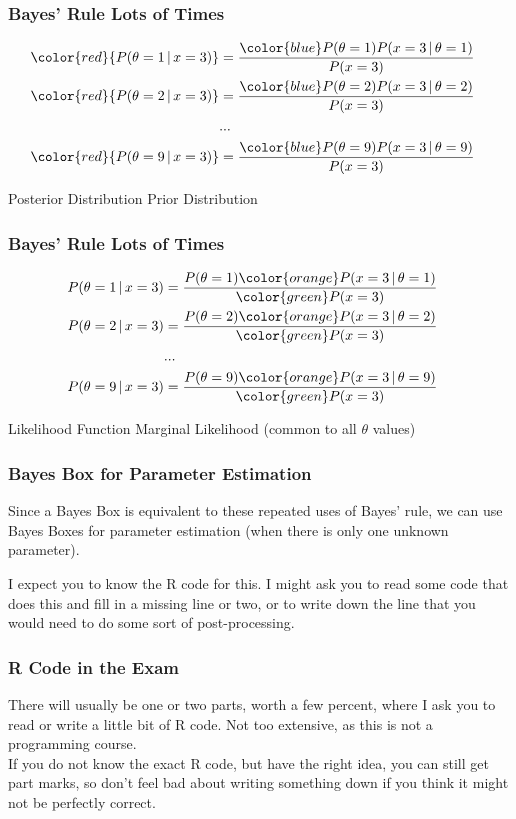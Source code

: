 \documentclass{beamer}
\newcommand{\given}{\,|\,}
\begin{document}
\begin{frame}
\frametitle{Bayes' Rule Lots of Times}
\begin{align}
\color{red}{P(\theta = 1 \given x = 3)} &= \frac{{\color{blue}P(\theta=1)}P(x=3 \given \theta=1)}{P(x=3)}\\
\color{red}{P(\theta = 2 \given x = 3)} &= \frac{{\color{blue}P(\theta=2)}P(x=3 \given \theta=2)}{P(x=3)}\\
&...&\\
\color{red}{P(\theta = 9 \given x = 3)} &= \frac{{\color{blue}P(\theta=9)}P(x=3 \given \theta=9)}{P(x=3)}\\
\end{align}

{\color{red}Posterior Distribution}
{\color{blue}Prior Distribution}

\end{frame}


\begin{frame}
\frametitle{Bayes' Rule Lots of Times}
\begin{align}
P(\theta = 1 \given x = 3) &= \frac{P(\theta=1){\color{orange}P(x=3 \given \theta=1)}}{\color{green}P(x=3)}\\
P(\theta = 2 \given x = 3) &= \frac{P(\theta=2){\color{orange}P(x=3 \given \theta=2)}}{\color{green}P(x=3)}\\
&...&\\
P(\theta = 9 \given x = 3) &= \frac{P(\theta=9){\color{orange}P(x=3 \given \theta=9)}}{\color{green}P(x=3)}\\
\end{align}

{\color{orange}Likelihood Function}
{\color{green}Marginal Likelihood (common to all $\theta$ values)}

\end{frame}

\begin{frame}
\frametitle{Bayes Box for Parameter Estimation}
Since a Bayes Box is equivalent to these repeated uses of Bayes' rule,
we can use Bayes Boxes for parameter estimation (when there is only one unknown
parameter).\pause

I expect you to know the R code for this. I might ask you to read some
code that does this and fill in a missing line or two, or to write down the
line that you would need to do some sort of post-processing.

\end{frame}

\begin{frame}
\frametitle{R Code in the Exam}
There will usually be one or two parts, worth a few percent, where I ask you
to read or write a little bit of R code. Not too extensive, as this is not
a programming course.\pause\\[1em]

If you do not know the exact R code, but have the right idea, you can still
get part marks, so don't feel bad about writing something down if you think
it might not be perfectly correct.

\end{frame}
\end{document}

